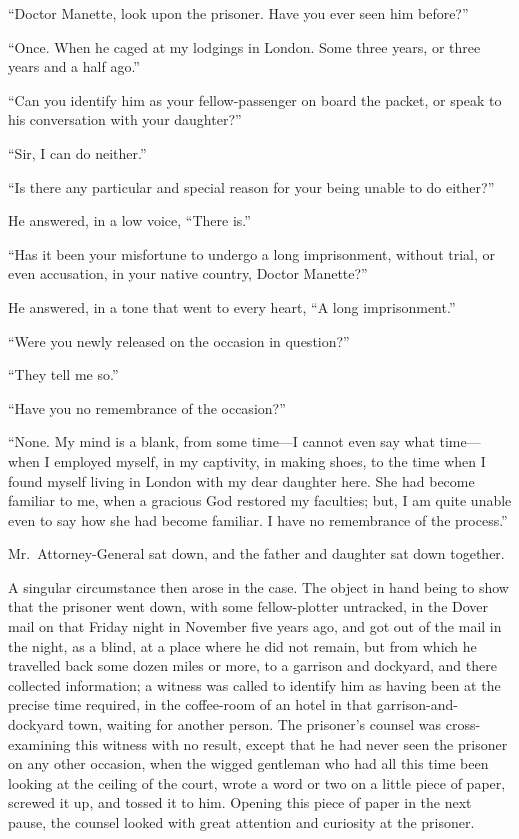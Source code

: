 ``Doctor Manette, look upon the prisoner.  Have you ever seen him before?''

``Once.  When he caged at my lodgings in London.  Some three years, or
three years and a half ago.''

``Can you identify him as your fellow-passenger on board the packet,
or speak to his conversation with your daughter?''

``Sir, I can do neither.''

``Is there any particular and special reason for your being unable to
do either?''

He answered, in a low voice, ``There is.''

``Has it been your misfortune to undergo a long imprisonment, without
trial, or even accusation, in your native country, Doctor Manette?''

He answered, in a tone that went to every heart, ``A long imprisonment.''

``Were you newly released on the occasion in question?''

``They tell me so.''

``Have you no remembrance of the occasion?''

``None.  My mind is a blank, from some time---I cannot even say what time---%
when I employed myself, in my captivity, in making shoes,
to the time when I found myself living in London with my dear
daughter here.  She had become familiar to me, when a gracious God
restored my faculties; but, I am quite unable even to say how she
had become familiar.  I have no remembrance of the process.''

Mr.\ Attorney-General sat down, and the father and daughter sat down together.

A singular circumstance then arose in the case.  The object in hand
being to show that the prisoner went down, with some fellow-plotter
untracked, in the Dover mail on that Friday night in November five
years ago, and got out of the mail in the night, as a blind, at a
place where he did not remain, but from which he travelled back some
dozen miles or more, to a garrison and dockyard, and there collected
information; a witness was called to identify him as having been at
the precise time required, in the coffee-room of an hotel in that
garrison-and-dockyard town, waiting for another person.  The prisoner's
counsel was cross-examining this witness with no result, except that
he had never seen the prisoner on any other occasion, when the wigged
gentleman who had all this time been looking at the ceiling of the
court, wrote a word or two on a little piece of paper, screwed it up,
and tossed it to him.  Opening this piece of paper in the next pause,
the counsel looked with great attention and curiosity at the prisoner.

